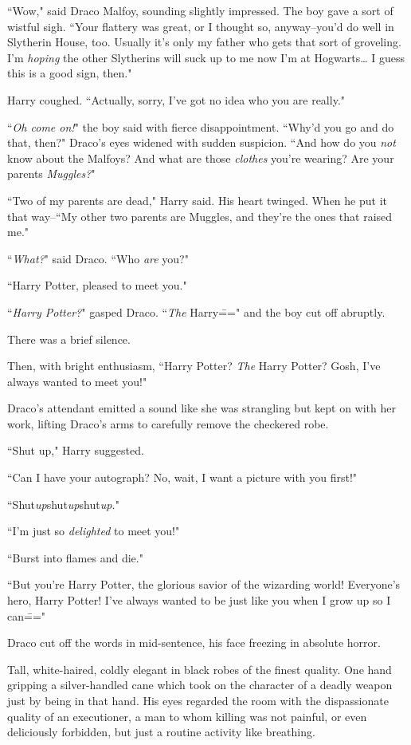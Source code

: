 ``Wow," said Draco Malfoy, sounding slightly impressed. The boy gave a sort of wistful sigh. ``Your flattery was great, or I thought so, anyway\---you'd do well in Slytherin House, too. Usually it's only my father who gets that sort of groveling. I'm \emph{hoping} the other Slytherins will suck up to me now I'm at Hogwarts{\ldots} I guess this is a good sign, then."

Harry coughed. ``Actually, sorry, I've got no idea who you are really."

``\emph{Oh come on!}" the boy said with fierce disappointment. ``Why'd you go and do that, then?" Draco's eyes widened with sudden suspicion. ``And how do you \emph{not} know about the Malfoys? And what are those \emph{clothes} you're wearing? Are your parents \emph{Muggles?}"

``Two of my parents are dead," Harry said. His heart twinged. When he put it that way\---``My other two parents are Muggles, and they're the ones that raised me."

``\emph{What?}" said Draco. ``Who \emph{are} you?"

``Harry Potter, pleased to meet you."

``\emph{Harry Potter?}" gasped Draco. ``\emph{The} Harry\===" and the boy cut off abruptly.

There was a brief silence.

Then, with bright enthusiasm, ``Harry Potter? \emph{The} Harry Potter? Gosh, I've always wanted to meet you!"

Draco's attendant emitted a sound like she was strangling but kept on with her work, lifting Draco's arms to carefully remove the checkered robe.

``Shut up," Harry suggested.

``Can I have your autograph? No, wait, I want a picture with you first!"

``Shut\emph{up}shut\emph{up}shut\emph{up.}"

``I'm just so \emph{delighted} to meet you!"

``Burst into flames and die."

``But you're Harry Potter, the glorious savior of the wizarding world! Everyone's hero, Harry Potter! I've always wanted to be just like you when I grow up so I can\==="

Draco cut off the words in mid-sentence, his face freezing in absolute horror.

Tall, white-haired, coldly elegant in black robes of the finest quality. One hand gripping a silver-handled cane which took on the character of a deadly weapon just by being in that hand. His eyes regarded the room with the dispassionate quality of an executioner, a man to whom killing was not painful, or even deliciously forbidden, but just a routine activity like breathing.


